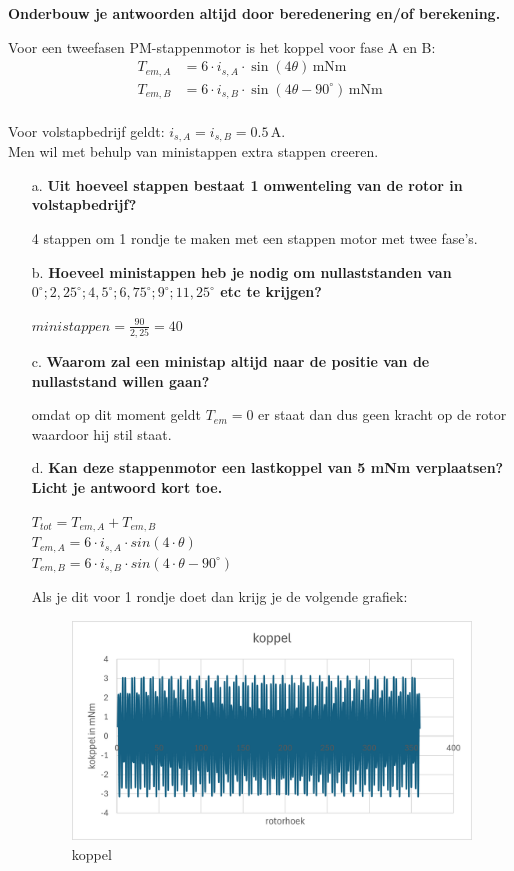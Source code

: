 \textbf{Onderbouw je antwoorden altijd door beredenering en/of berekening.}

Voor een tweefasen PM-stappenmotor is het koppel voor fase A en B:
\begin{align*}
    T_{em,A} &= 6 \cdot i_{s,A} \cdot \sin(4\theta) \, \text{mNm} \\
    T_{em,B} &= 6 \cdot i_{s,B} \cdot \sin(4\theta - 90^\circ) \, \text{mNm}
    \end{align*}\\
Voor volstapbedrijf geldt: \(i_{s,A} = i_{s,B} = 0.5 \, \text{A}\).\\
Men wil met behulp van ministappen extra stappen creeren.    


\begin{enumerate}
    \item [a.] \textbf{Uit hoeveel stappen bestaat 1 omwenteling van de rotor in volstapbedrijf?}
    
        4 stappen om 1 rondje te maken met een stappen motor met twee fase's.

    \item [b.] \textbf{Hoeveel ministappen heb je nodig om nullaststanden van $0^\circ ; 2,25^\circ ; 4,5^\circ ; 6,75^\circ ; 9^\circ ; 11,25^\circ$ etc te krijgen?}
    
        $ministappen = \frac{90}{2,25} = 40$

    \item [c.] \textbf{Waarom zal een ministap altijd naar de positie van de nullaststand willen gaan?}
    
        omdat op dit moment geldt $T_{em} = 0$ er staat dan dus geen kracht op de rotor  waardoor hij stil staat.


    \item [d.] \textbf{Kan deze stappenmotor een lastkoppel van 5 mNm verplaatsen?
    Licht je antwoord kort toe.}     
    
        $T_{tot} = T_{em,A} + T_{em,B}$\\
        $T_{em,A} = 6 \cdot i_{s,A} \cdot sin(4 \cdot \theta)$\\
        $T_{em,B} = 6 \cdot i_{s,B} \cdot sin(4 \cdot \theta - 90^\circ)$

        Als je dit voor 1 rondje doet dan krijg je de volgende grafiek:
        \begin{figure}[h]
            \centering
            \includegraphics[scale=0.9]{4e.png}
            \caption{koppel}
            \label{fig:4e}
        \end{figure}


\end{enumerate}
